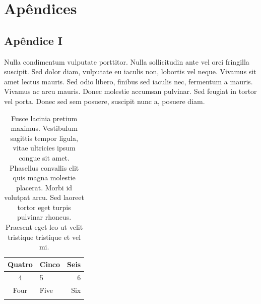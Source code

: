 \documentclass[book,A4paper,10pt,twoside,oldfontcommands]{memoir}\usepackage[]{graphicx}\usepackage[usenames,dvipsnames]{color}
\begin{document}





\chapter*{Apêndices}
\renewcommand{\thefigure}{A.\arabic{figure}}
\renewcommand{\thetable}{A.\arabic{table}}



\section*{Apêndice I}

Nulla condimentum vulputate porttitor. Nulla sollicitudin ante vel
orci fringilla suscipit. Sed dolor diam, vulputate eu iaculis non,
lobortis vel neque. Vivamus sit amet lectus mauris. Sed odio libero,
finibus sed iaculis nec, fermentum a mauris. Vivamus ac arcu mauris.
Donec molestie accumsan pulvinar. Sed feugiat in tortor vel porta.
Donec sed sem posuere, suscipit nunc a, posuere diam.

\begin{table}[h]
\centering
\caption{Fusce lacinia pretium maximus. Vestibulum sagittis tempor
  ligula, vitae ultricies ipsum congue sit amet. Phasellus convallis
  elit quis magna molestie placerat. Morbi id volutpat arcu. Sed
  laoreet tortor eget turpis pulvinar rhoncus. Praesent eget leo ut
  velit tristique tristique et vel mi.}
\begin{tabular}{clr} 
\hline
Quatro & Cinco & Seis\\
\hline
4 & 5 & 6 \\
Four & Five & Six\\
\hline
\label{Tab:A1}
\end{tabular}
\end{table}
\end{document}
